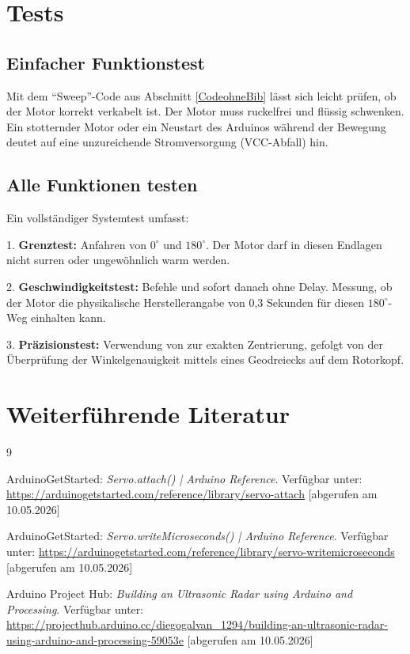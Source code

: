 \section{Tests}

\subsection{Einfacher Funktionstest}
Mit dem "`Sweep"'-Code aus Abschnitt \ref{CodeohneBib} lässt sich leicht prüfen, ob der Motor korrekt verkabelt ist. Der Motor muss ruckelfrei und flüssig schwenken. Ein stotternder Motor oder ein Neustart des Arduinos während der Bewegung deutet auf eine unzureichende Stromversorgung (VCC-Abfall) hin.

\subsection{Alle Funktionen testen}
Ein vollständiger Systemtest umfasst:


1. \textbf{Grenztest:} Anfahren von $0^\circ$ und $180^\circ$. Der Motor darf in diesen Endlagen nicht surren oder ungewöhnlich warm werden.

2. \textbf{Geschwindigkeitstest:} Befehle  und sofort danach  ohne Delay. Messung, ob der Motor die physikalische Herstellerangabe von 0,3 Sekunden für diesen $180^\circ$-Weg einhalten kann.

3. \textbf{Präzisionstest:} Verwendung von  zur exakten Zentrierung, gefolgt von der Überprüfung der Winkelgenauigkeit mittels eines Geodreiecks auf dem Rotorkopf.

\section{Weiterführende Literatur}

\begin{thebibliography}{9}
	
	ArduinoGetStarted: \textit{Servo.attach() | Arduino Reference}. Verfügbar unter:
	\url{https://arduinogetstarted.com/reference/library/servo-attach}
	[abgerufen am 10.05.2026]
	
	ArduinoGetStarted: \textit{Servo.writeMicroseconds() | Arduino Reference}. Verfügbar unter:
	\url{https://arduinogetstarted.com/reference/library/servo-writemicroseconds}
	[abgerufen am 10.05.2026]
	
	Arduino Project Hub: \textit{Building an Ultrasonic Radar using Arduino and Processing}. Verfügbar unter:
	\url{https://projecthub.arduino.cc/diegogalvan_1294/building-an-ultrasonic-radar-using-arduino-and-processing-59053e}
	[abgerufen am 10.05.2026]
\end{thebibliography}
